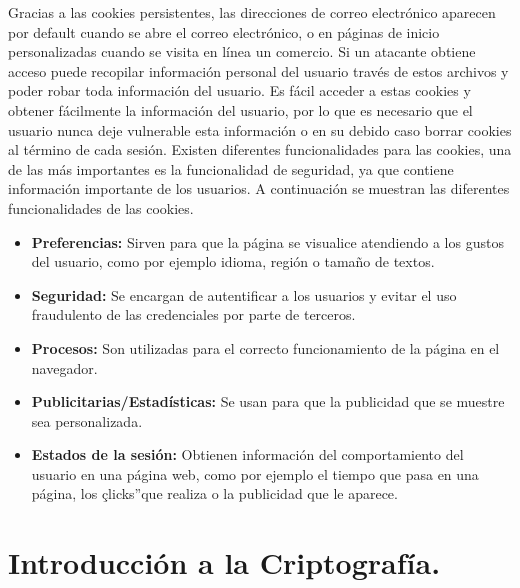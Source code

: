 \documentclass[12pt, a4paper, titlepage]{report}
\begin{document}
		Gracias a las cookies persistentes, las direcciones de correo electrónico aparecen por default cuando se abre el correo electrónico, o en páginas de inicio personalizadas cuando se visita en línea un comercio. Si un atacante obtiene acceso puede recopilar información personal del usuario través de estos archivos y poder robar toda información del usuario. Es fácil acceder a estas cookies y obtener fácilmente la información del usuario, por lo que es necesario que el usuario nunca deje vulnerable esta información o en su debido caso borrar cookies al término de cada sesión.
		Existen diferentes funcionalidades para las cookies, una de las más importantes es la funcionalidad de seguridad, ya que contiene información importante de los usuarios. A continuación se muestran las diferentes funcionalidades de las cookies.
		
		\begin{itemize}
		    \item \textbf{Preferencias:} Sirven para que la página se visualice atendiendo a los gustos del usuario, como por ejemplo idioma, región o tamaño de textos.
		    \item \textbf{Seguridad:} Se encargan de autentificar a los usuarios y evitar el uso fraudulento de las credenciales por parte de terceros.
		    \item \textbf{Procesos:} Son utilizadas para el correcto funcionamiento de la página en el navegador.
		    \item \textbf{Publicitarias/Estadísticas:} Se usan para que la publicidad que se muestre sea personalizada.
		    \item \textbf{Estados de la sesión:} Obtienen información del comportamiento del usuario en una página web, como por ejemplo el tiempo que pasa en una página, los çlicks”que realiza o la publicidad que le aparece.
		\end{itemize}
		
	    \section{Introducción a la Criptografía.}
\end{document}
